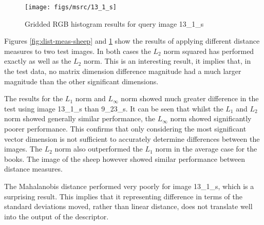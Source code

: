 \begin{appendices}
\begin{figure}[ht]
	\begin{minipage}[]{0.3\linewidth}
		\centering
		\texttt{[image: figs/msrc/13\_1\_s]}
	\end{minipage}
	\begin{minipage}[]{0.7\linewidth}
		\centering
	\end{minipage}
	\caption{Gridded RGB histogram results for query image 13\_1\_s}
	\label{fig:dist-meas-books}
\end{figure}

Figures \ref{fig:dist-meas-sheep} and \ref{fig:dist-meas-books} show the results of applying different distance measures to two test images. In both cases the $L_2$ norm squared has performed exactly as well as the $L_2$ norm. This is an interesting result, it implies that, in the test data, no matrix dimension difference magnitude had a much larger magnitude than the other significant dimensions.

The results for the $L_1$ norm and $L_\infty$ norm showed much greater difference in the test using image 13\_1\_s than 9\_23\_s. It can be seen that whilst the $L_1$ and $L_2$ norm showed generally similar performance, the $L_\infty$ norm showed significantly poorer performance. This confirms that only considering the most significant vector dimension is not sufficient to accurately determine differences between the images. The $L_2$ norm also outperformed the $L_1$ norm in the average case for the books. The image of the sheep however showed similar performance between distance measures.

The Mahalanobis distance performed very poorly for image 13\_1\_s, which is a surprising result. This implies that it representing difference in terms of the standard deviations moved, rather than linear distance, does not translate well into the output of the descriptor.


\end{appendices}
